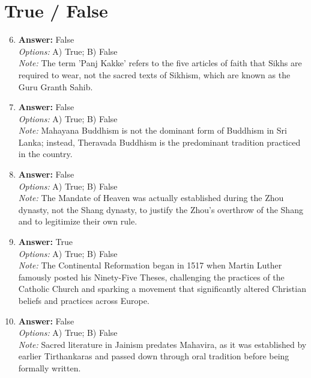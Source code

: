 \documentclass[12pt]{article}
\begin{document}
\section*{True / False}
\begin{enumerate}[label=\arabic*.]
\setcounter{enumi}{5}
\item \textbf{Answer:} False
\\ \textit{Options:} A) True; B) False
\\ \textit{Note:} The term 'Panj Kakke' refers to the five articles of faith that Sikhs are required to wear, not the sacred texts of Sikhism, which are known as the Guru Granth Sahib.
\item \textbf{Answer:} False
\\ \textit{Options:} A) True; B) False
\\ \textit{Note:} Mahayana Buddhism is not the dominant form of Buddhism in Sri Lanka; instead, Theravada Buddhism is the predominant tradition practiced in the country.
\item \textbf{Answer:} False
\\ \textit{Options:} A) True; B) False
\\ \textit{Note:} The Mandate of Heaven was actually established during the Zhou dynasty, not the Shang dynasty, to justify the Zhou's overthrow of the Shang and to legitimize their own rule.
\item \textbf{Answer:} True
\\ \textit{Options:} A) True; B) False
\\ \textit{Note:} The Continental Reformation began in 1517 when Martin Luther famously posted his Ninety-Five Theses, challenging the practices of the Catholic Church and sparking a movement that significantly altered Christian beliefs and practices across Europe.
\item \textbf{Answer:} False
\\ \textit{Options:} A) True; B) False
\\ \textit{Note:} Sacred literature in Jainism predates Mahavira, as it was established by earlier Tirthankaras and passed down through oral tradition before being formally written.
\end{enumerate}
\end{document}
